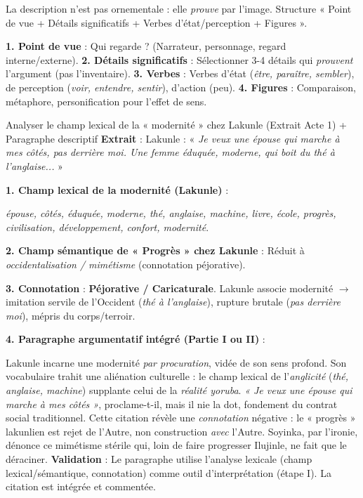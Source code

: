 \documentclass[11pt]{article}
\newcommand{\cle}[1]{{\popxbold\color{popdark}#1}}
\begin{document}
\begin{methode}
La description n'est pas ornementale : elle \emph{prouve} par l'image. Structure \cle{« Point de vue + Détails significatifs + Verbes d'état/perception + Figures »}.\par
\textbf{1. Point de vue} : Qui regarde ? (Narrateur, personnage, regard interne/externe). \textbf{2. Détails significatifs} : Sélectionner 3-4 détails qui \emph{prouvent} l'argument (pas l'inventaire). \textbf{3. Verbes} : Verbes d'état (\emph{être, paraître, sembler}), de perception (\emph{voir, entendre, sentir}), d'action (peu). \textbf{4. Figures} : Comparaison, métaphore, personification pour l'effet de sens.
\end{methode}

\begin{exoresolu}{Analyser le champ lexical de la « modernité » chez Lakunle (Extrait Acte 1) + Paragraphe descriptif}
\textbf{Extrait} : Lakunle : « \emph{Je veux une épouse qui marche à mes côtés, pas derrière moi. Une femme éduquée, moderne, qui boit du thé à l'anglaise...} »\par
\textbf{1. Champ lexical de la modernité (Lakunle)} :\par
\emph{épouse, côtés, éduquée, moderne, thé, anglaise, machine, livre, école, progrès, civilisation, développement, confort, modernité}.\par
\textbf{2. Champ sémantique de « Progrès » chez Lakunle} : Réduit à \emph{occidentalisation / mimétisme} (connotation péjorative).\par
\textbf{3. Connotation} : \textbf{Péjorative / Caricaturale}. Lakunle associe modernité $\rightarrow$ imitation servile de l'Occident (\emph{thé à l'anglaise}), rupture brutale (\emph{pas derrière moi}), mépris du corps/terroir.\par
\textbf{4. Paragraphe argumentatif intégré (Partie I ou II)} :\par
Lakunle incarne une modernité \emph{par procuration}, vidée de son sens profond. Son vocabulaire trahit une aliénation culturelle : le champ lexical de l'\emph{anglicité} (\emph{thé, anglaise, machine}) supplante celui de la \emph{réalité yoruba}. \emph{« Je veux une épouse qui marche à mes côtés »}, proclame-t-il, mais il nie la dot, fondement du contrat social traditionnel. Cette citation révèle une \emph{connotation} négative : le « progrès » lakunlien est rejet de l'Autre, non construction \emph{avec} l'Autre. Soyinka, par l'ironie, dénonce ce mimétisme stérile qui, loin de faire progresser Ilujinle, ne fait que le déraciner.
\tcblower
\textbf{Validation} : Le paragraphe utilise l'analyse lexicale (champ lexical/sémantique, connotation) comme outil d'interprétation (étape I). La citation est intégrée et commentée.
\end{exoresolu}
\end{document}
